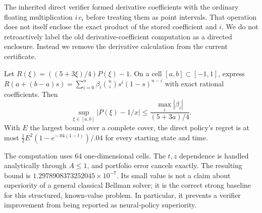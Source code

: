 The inherited direct verifier formed derivative coefficients with the ordinary floating multiplication $i\,c_i$ before treating them as point intervals. That operation does not itself enclose the exact product of the stored coefficient and $i$. We do not retroactively label the old derivative-coefficient computation as a directed enclosure. Instead we remove the derivative calculation from the current certificate.

\begin{lemma}\label{lem:bernstein}
Let $R(\xi)=((5+3\xi)/4)P(\xi)-1$. On a cell $[a,b]\subset[-1,1]$, express $R(a+(b-a)s)=\sum_{i=0}^n\beta_i {n\choose i}s^i(1-s)^{n-i}$ with exact rational coefficients. Then
\begin{equation}
 \sup_{\xi\in[a,b]}|P(\xi)-1/x|
 \leq\frac{\max_i|\beta_i|}{(5+3a)/4}.\label{eq:bernstein}
\end{equation}
With $E$ the largest bound over a complete cover, the direct policy's regret is at most $\tfrac12 E^2(1-e^{-.04(1-t)})/.04$ for every starting state and time.
\end{lemma}
The computation uses 64 one-dimensional cells. The $t,z$ dependence is handled analytically through $A\leq1$, and portfolio error cancels exactly. The resulting bound is $1.2978908373252045\times10^{-7}$. Its small value is not a claim about superiority of a general classical Bellman solver; it is the correct strong baseline for this structured, known-value problem. In particular, it prevents a verifier improvement from being reported as neural-policy superiority.
